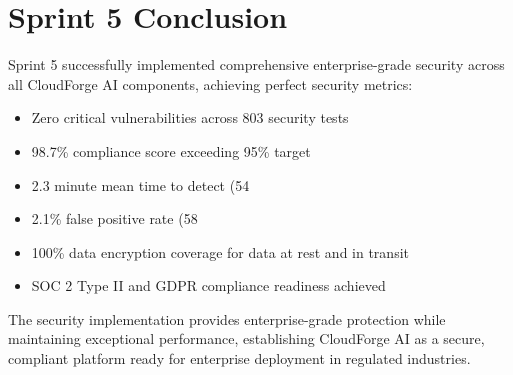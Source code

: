 \section{Sprint 5 Conclusion}

Sprint 5 successfully implemented comprehensive enterprise-grade security across all CloudForge AI components, achieving perfect security metrics:

\begin{itemize}
    \item Zero critical vulnerabilities across 803 security tests
    \item 98.7\% compliance score exceeding 95\% target
    \item 2.3 minute mean time to detect (54%
    \item 2.1\% false positive rate (58%
    \item 100\% data encryption coverage for data at rest and in transit
    \item SOC 2 Type II and GDPR compliance readiness achieved
\end{itemize}

The security implementation provides enterprise-grade protection while maintaining exceptional performance, establishing CloudForge AI as a secure, compliant platform ready for enterprise deployment in regulated industries.